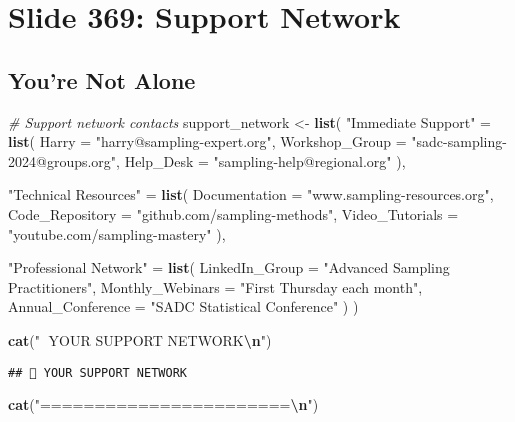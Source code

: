 \documentclass[
]{article}
\newenvironment{Shaded}{\begin{snugshade}}{\end{snugshade}}
\newcommand{\AttributeTok}[1]{\textcolor[rgb]{0.13,0.29,0.53}{#1}}
\newcommand{\CommentTok}[1]{\textcolor[rgb]{0.56,0.35,0.01}{\textit{#1}}}
\newcommand{\FunctionTok}[1]{\textcolor[rgb]{0.13,0.29,0.53}{\textbf{#1}}}
\newcommand{\NormalTok}[1]{#1}
\newcommand{\OtherTok}[1]{\textcolor[rgb]{0.56,0.35,0.01}{#1}}
\newcommand{\SpecialCharTok}[1]{\textcolor[rgb]{0.81,0.36,0.00}{\textbf{#1}}}
\newcommand{\StringTok}[1]{\textcolor[rgb]{0.31,0.60,0.02}{#1}}
\begin{document}
\section{Slide 369: Support Network}\label{slide-369-support-network}

\subsection{You're Not Alone}\label{youre-not-alone}

\begin{Shaded}
\begin{Highlighting}[]
\CommentTok{\# Support network contacts}
\NormalTok{support\_network }\OtherTok{\textless{}{-}} \FunctionTok{list}\NormalTok{(}
  \StringTok{"Immediate Support"} \OtherTok{=} \FunctionTok{list}\NormalTok{(}
    \AttributeTok{Harry =} \StringTok{"harry@sampling{-}expert.org"}\NormalTok{,}
    \AttributeTok{Workshop\_Group =} \StringTok{"sadc{-}sampling{-}2024@groups.org"}\NormalTok{,}
    \AttributeTok{Help\_Desk =} \StringTok{"sampling{-}help@regional.org"}
\NormalTok{  ),}
  
  \StringTok{"Technical Resources"} \OtherTok{=} \FunctionTok{list}\NormalTok{(}
    \AttributeTok{Documentation =} \StringTok{"www.sampling{-}resources.org"}\NormalTok{,}
    \AttributeTok{Code\_Repository =} \StringTok{"github.com/sampling{-}methods"}\NormalTok{,}
    \AttributeTok{Video\_Tutorials =} \StringTok{"youtube.com/sampling{-}mastery"}
\NormalTok{  ),}
  
  \StringTok{"Professional Network"} \OtherTok{=} \FunctionTok{list}\NormalTok{(}
    \AttributeTok{LinkedIn\_Group =} \StringTok{"Advanced Sampling Practitioners"}\NormalTok{,}
    \AttributeTok{Monthly\_Webinars =} \StringTok{"First Thursday each month"}\NormalTok{,}
    \AttributeTok{Annual\_Conference =} \StringTok{"SADC Statistical Conference"}
\NormalTok{  )}
\NormalTok{)}

\FunctionTok{cat}\NormalTok{(}\StringTok{"🤝 YOUR SUPPORT NETWORK}\SpecialCharTok{\textbackslash{}n}\StringTok{"}\NormalTok{)}
\end{Highlighting}
\end{Shaded}

\begin{verbatim}
## 🤝 YOUR SUPPORT NETWORK
\end{verbatim}

\begin{Shaded}
\begin{Highlighting}[]
\FunctionTok{cat}\NormalTok{(}\StringTok{"=======================}\SpecialCharTok{\textbackslash{}n}\StringTok{"}\NormalTok{)}
\end{Highlighting}
\end{Shaded}
\end{document}
